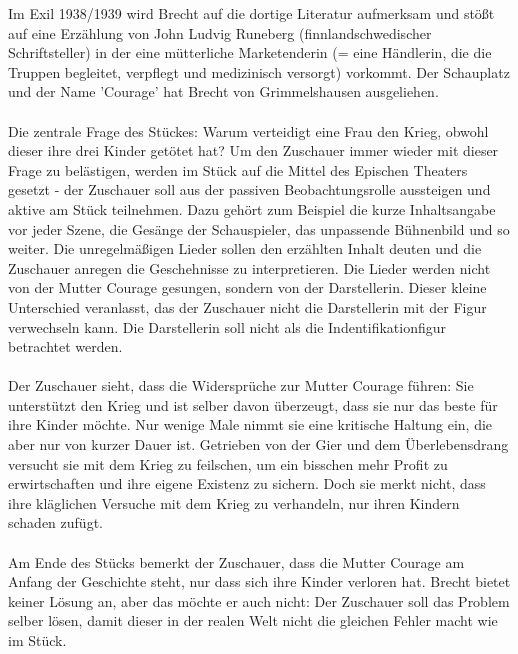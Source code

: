 \documentclass[a4paper]{article}
\begin{document}
        Im Exil 1938/1939 wird Brecht auf die dortige Literatur aufmerksam und stößt auf eine Erzählung von John Ludvig Runeberg (finnlandschwedischer Schriftsteller) in der eine mütterliche Marketenderin (= eine Händlerin, die die Truppen begleitet, verpflegt und medizinisch versorgt) vorkommt. Der Schauplatz und der Name 'Courage' hat Brecht von Grimmelshausen ausgeliehen.\\\\
Die zentrale Frage des Stückes: Warum verteidigt eine Frau den Krieg, obwohl dieser ihre drei Kinder getötet hat? Um den Zuschauer immer wieder mit dieser Frage zu belästigen, werden im Stück auf die Mittel des Epischen Theaters gesetzt - der Zuschauer soll aus der passiven Beobachtungsrolle aussteigen und aktive am Stück teilnehmen. Dazu gehört zum Beispiel die kurze Inhaltsangabe vor jeder Szene, die Gesänge der Schauspieler, das unpassende Bühnenbild und so weiter. Die unregelmäßigen Lieder sollen den erzählten Inhalt deuten und die Zuschauer anregen die Geschehnisse zu interpretieren. Die Lieder werden nicht von der Mutter Courage gesungen, sondern von der Darstellerin. Dieser kleine Unterschied veranlasst, das der Zuschauer nicht die Darstellerin mit der Figur verwechseln kann. Die Darstellerin soll nicht als die Indentifikationfigur betrachtet werden.\\\\
Der Zuschauer sieht, dass die Widersprüche zur Mutter Courage führen: Sie unterstützt den Krieg und ist selber davon überzeugt, dass sie nur das beste für ihre Kinder möchte. Nur wenige Male nimmt sie eine kritische Haltung ein, die aber nur von kurzer Dauer ist. Getrieben von der Gier und dem Überlebensdrang versucht sie mit dem Krieg zu feilschen, um ein bisschen mehr Profit zu erwirtschaften und ihre eigene Existenz zu sichern. Doch sie merkt nicht, dass ihre kläglichen Versuche mit dem Krieg zu verhandeln, nur ihren Kindern schaden zufügt.\\\\
Am Ende des Stücks bemerkt der Zuschauer, dass die Mutter Courage am Anfang der Geschichte steht, nur dass sich ihre Kinder verloren hat. Brecht bietet keiner Lösung an, aber das möchte er auch nicht: Der Zuschauer soll das Problem selber lösen, damit dieser in der realen Welt nicht die gleichen Fehler macht wie im Stück.
\end{document}
